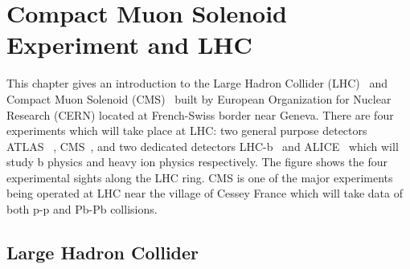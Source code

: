 \def\baselinestretch{1}

\chapter{Compact Muon Solenoid Experiment and LHC }



This chapter gives an introduction to the Large Hadron Collider
(LHC)~\cite{lhc} and Compact Muon Solenoid (CMS)~\cite{cms}
built by European Organization for Nuclear Research (CERN)
located at French-Swiss border near Geneva. There are four
experiments which will take place at LHC: two general purpose
detectors ATLAS~\cite{atlas} , CMS~\cite{cms}, and two
dedicated detectors LHC-b~\cite{lhcb} and ALICE~\cite{alice}
which will study b physics and heavy ion physics respectively.
The figure shows the four experimental sights along the LHC
ring. CMS is one of the major experiments being operated at LHC
near the village of Cessey France which will take data of both
p-p and Pb-Pb collisions.

\smallskip

\goodbreak
\section{Large Hadron Collider}

